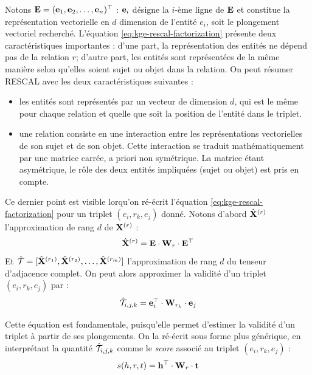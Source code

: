 Notons $\bf{E} = (\bf{e}_1, \bf{e}_2, \ldots, \bf{e}_n)^\top$ : $\bf{e}_i$ désigne la $i$-ème ligne de $\bf{E}$ et constitue la représentation vectorielle en $d$ dimension de l'entité $e_i$, soit le plongement vectoriel recherché. L'équation \ref{eq:kge-rescal-factorization} présente deux caractéristiques importantes : d'une part, la représentation des entités ne dépend pas de la relation $r$; d'autre part, les entités sont représentées de la même manière selon qu'elles soient sujet ou objet dans la relation. On peut résumer RESCAL avec les deux caractéristiques suivantes :
\begin{itemize}
    \item les entités sont représentés par un vecteur de dimension $d$, qui est le même pour chaque relation et quelle que soit la position de l'entité dans le triplet. 
    \item une relation consiste en une interaction entre les représentations vectorielles de son sujet et de son objet. Cette interaction se traduit mathématiquement par une matrice carrée, a priori non symétrique. La matrice étant asymétrique, le rôle des deux entités impliquées (sujet ou objet) est pris en compte.
\end{itemize}

Ce dernier point est visible lorqu'on ré-écrit l'équation \ref{eq:kge-rescal-factorization} pour un triplet $(e_i, r_k, e_j)$ donné. Notons d'abord $\hat{\bf{X}}^{(r)}$ l'approximation de rang $d$ de $\bf{X}^{(r)}$ :
\begin{equation*}
    \hat{\bf{X}}^{(r)} = \bf{E} \cdot \bf{W}_r \cdot \bf{E}^\top
\end{equation*}
Et $\hat{\cal{T}} = [\hat{\bf{X}}^{(r_1)}, \hat{\bf{X}}^{(r_2)}, \ldots, \hat{\bf{X}}^{(r_m)}]$ l'approximation de rang $d$ du tenseur d'adjacence complet. On peut alors approximer la validité d'un triplet $(e_i, r_k, e_j)$ par :
\begin{equation}
    \hat{\cal{T}}_{i, j, k} = \bf{e}_i^\top \cdot \bf{W}_{r_k} \cdot \bf{e}_j
\end{equation}

Cette équation est fondamentale, puisqu'elle permet d'estimer la validité d'un triplet à partir de ses plongements. On la ré-écrit sous forme plus générique, en interprétant la quantité $\hat{\cal{T}}_{i, j, k}$ comme le \textit{score} associé au triplet $(e_i, r_k, e_j)$ : 
\begin{equation}
    s(h, r, t) = \mathbf{h}^\top \cdot \bf{W}_r \cdot \bf{t}
    \label{eq:rescal}
\end{equation}

